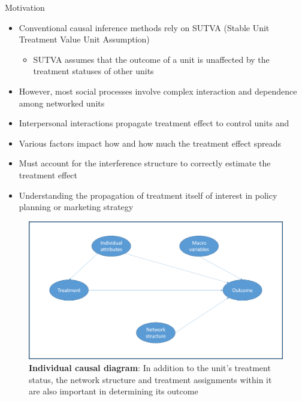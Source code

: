 \documentclass[final]{beamer}
\newlength{\onecolwid}
\newlength{\onecolwidd}
\begin{document}
\begin{frame}[t]
\begin{columns}[t]
\begin{column}{\onecolwidd}
\begin{block}{Motivation}
\begin{rmfamily}
\begin{itemize}
	\item Conventional causal inference methods rely on SUTVA (Stable Unit Treatment Value Unit Assumption)
	\vspace*{.1in}
		\begin{itemize}
		\item SUTVA assumes that the outcome of a unit is unaffected by the treatment statuses of other units
		\end{itemize}
		\vspace*{.1in}	
	\item However, most social processes involve complex interaction and dependence among networked units
	\vspace*{.1in}
	\item Interpersonal interactions propagate treatment effect to control units and
	\vspace*{.1in}
	\item Various factors impact how and how much the treatment effect spreads
	\vspace*{.1in}
	\item Must account for the interference structure to correctly estimate the treatment effect
	\vspace*{.1in}
	\item Understanding the propagation of treatment itself of interest in policy planning or marketing strategy
	
	\end{itemize}
	\end{rmfamily}

	\vspace*{.3in}	
\centering
\begin{figure}
\centering
\includegraphics[scale=0.8]{Individual_structure.png}
\vspace*{10mm}
\caption{\small \textbf{Individual causal diagram}: In addition to the unit's treatment status, the network structure and treatment assignments within it are also important in determining its outcome}
\end{figure}
	

\end{block}
\end{column}
\end{columns}
\end{frame}
\end{document}
